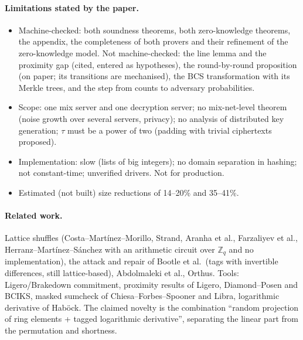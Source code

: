 \documentclass[11pt,a4paper]{article}
\newcommand{\Zq}{\mathbb{Z}_q}
\theoremstyle{definition}
\theoremstyle{plain}
\begin{document}
\paragraph{Limitations stated by the paper.}
\begin{itemize}[leftmargin=1.3em]
\item Machine-checked: both soundness theorems, both zero-knowledge theorems, the appendix, the completeness
  of both provers and their refinement of the zero-knowledge model. Not machine-checked: the line lemma and
  the proximity gap (cited, entered as hypotheses), the round-by-round proposition (on paper; its transitions
  are mechanised), the BCS transformation with its Merkle trees, and the step from counts to adversary
  probabilities.
\item Scope: one mix server and one decryption server; no mix-net-level theorem (noise growth over several
  servers, privacy); no analysis of distributed key generation; $\tau$ must be a power of two (padding with
  trivial ciphertexts proposed).
\item Implementation: slow (lists of big integers); no domain separation in hashing; not constant-time;
  unverified drivers. Not for production.
\item Estimated (not built) size reductions of 14--20\% and 35--41\%.
\end{itemize}


\paragraph{Related work.} Lattice shuffles (Costa--Mart\'inez--Morillo, Strand, Aranha et al., Farzaliyev
et al., Herranz--Mart\'inez--S\'anchez with an arithmetic circuit over $\Zq$ and no implementation), the attack
and repair of Bootle et al.\ (tags with invertible differences, still lattice-based), Abdolmaleki et al.,
Orthus. Tools: Ligero/Brakedown commitment, proximity results of Ligero, Diamond--Posen and BCIKS, masked
sumcheck of Chiesa--Forbes--Spooner and Libra, logarithmic derivative of Hab\"ock. The claimed novelty is the
combination ``random projection of ring elements + tagged logarithmic derivative'', separating the linear
part from the permutation and shortness.
\end{document}
